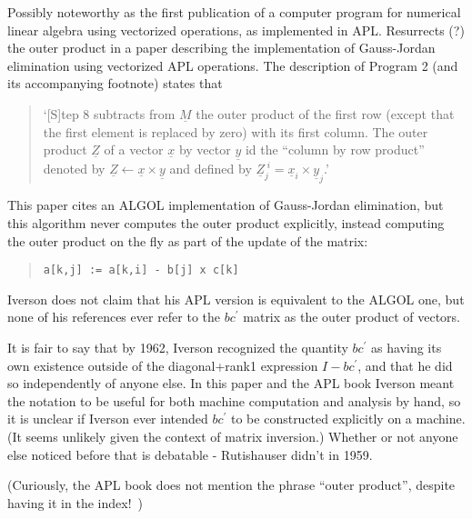 Possibly noteworthy as the first publication of a computer program for numerical linear algebra using vectorized operations, as implemented in APL.
Resurrects (?) the outer product in a paper describing the implementation of Gauss-Jordan elimination using vectorized APL operations. The description of Program 2 (and its accompanying footnote) states that

\begin{quote}
`[S]tep 8 subtracts from $\underline{\textit{M}}$ the outer product of the first row (except that the first element is replaced by zero) with its first column. The outer product $\underline{\textit{Z}}$ of a vector $\underline{\textit{x}}$ by vector $\underline{\textit{y}}$ id the ``column by row product'' denoted by $\underline{\textit{Z}} \leftarrow \underline{\textit{x}} \times \underline{\textit{y}}$ and defined by $\underline{\textit{Z}}^{\; i}_j = \underline{\textit{x}}_i \times \underline{\textit{y}}_j$.'
\end{quote}

This paper cites an ALGOL implementation of Gauss-Jordan elimination, but this algorithm never computes the outer product explicitly, instead computing the outer product on the fly as part of the update of the matrix:~\cite{Cohen1961}

\begin{quote}
\begin{verbatim}
a[k,j] := a[k,i] - b[j] x c[k]
\end{verbatim}
\end{quote}

Iverson does not claim that his APL version is equivalent to the ALGOL one, but none of his references ever refer to the $b c^\prime$ matrix as the outer product of vectors.

It is fair to say that by 1962, Iverson recognized the quantity $b c^\prime$ as having its own existence outside of the diagonal+rank1 expression $I - b c^\prime$, and that he did so independently of anyone else. In this paper and the APL book Iverson meant the notation to be useful for both machine computation and analysis by hand, so it is unclear if Iverson ever intended $b c^\prime$ to be constructed explicitly on a machine. (It seems unlikely given the context of matrix inversion.) Whether or not anyone else noticed before that is debatable - Rutishauser didn't in 1959.

(Curiously, the APL book does not mention the phrase ``outer product'', despite having it in the index!~\cite{Iverson1962book})


